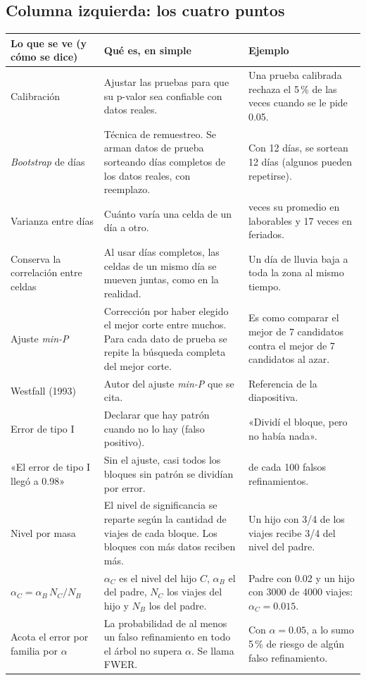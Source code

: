 \documentclass[11pt,a4paper]{article}
\makeatletter
\newenvironment{partes}{%
  \begin{longtable}{@{}>{\raggedright\arraybackslash}p{4.3cm}>{\raggedright\arraybackslash}p{6.0cm}>{\raggedright\arraybackslash}p{5.0cm}@{}}
  \toprule \textbf{Lo que se ve (y cómo se dice)} & \textbf{Qué es, en simple} & \textbf{Ejemplo}\\ \midrule \endhead}{%
  \bottomrule\end{longtable}}
\newcommand{\se}[1]{\newline{\small\color{ucspblue}(se dice «#1»)}}
\makeatother
\begin{document}
\subsection*{Columna izquierda: los cuatro puntos}

\begin{partes}
Calibración & Ajustar las pruebas para que su p-valor sea confiable con datos reales. & Una prueba calibrada rechaza el 5\,\% de las veces cuando se le pide 0.05. \\
\emph{Bootstrap} de días \se{bútstrap de días} & Técnica de remuestreo. Se arman datos de prueba sorteando días completos de los datos reales, con reemplazo. & Con 12 días, se sortean 12 días (algunos pueden repetirse). \\
Varianza entre días & Cuánto varía una celda de un día a otro. & 3 veces su promedio en laborables y 17 veces en feriados. \\
Conserva la correlación entre celdas & Al usar días completos, las celdas de un mismo día se mueven juntas, como en la realidad. & Un día de lluvia baja a toda la zona al mismo tiempo. \\
Ajuste \emph{min-P} \se{mín pe} & Corrección por haber elegido el mejor corte entre muchos. Para cada dato de prueba se repite la búsqueda completa del mejor corte. & Es como comparar el mejor de 7 candidatos contra el mejor de 7 candidatos al azar. \\
Westfall (1993) & Autor del ajuste \emph{min-P} que se cita. & Referencia de la diapositiva. \\
Error de tipo I \se{error de tipo uno} & Declarar que hay patrón cuando no lo hay (falso positivo). & «Dividí el bloque, pero no había nada». \\
«El error de tipo I llegó a 0.98» & Sin el ajuste, casi todos los bloques sin patrón se dividían por error. & 98 de cada 100 falsos refinamientos. \\
Nivel por masa \se{nivel por masa} & El nivel de significancia se reparte según la cantidad de viajes de cada bloque. Los bloques con más datos reciben más. & Un hijo con 3/4 de los viajes recibe 3/4 del nivel del padre. \\
$\alpha_C=\alpha_B\,N_C/N_B$ \se{alfa sub C es igual a alfa sub B por N sub C sobre N sub B} & $\alpha_C$ es el nivel del hijo $C$, $\alpha_B$ el del padre, $N_C$ los viajes del hijo y $N_B$ los del padre. & Padre con 0.02 y un hijo con 3000 de 4000 viajes: $\alpha_C=0.015$. \\
Acota el error por familia por $\alpha$ \se{efe-doble u-e-erre} & La probabilidad de al menos un falso refinamiento en todo el árbol no supera $\alpha$. Se llama FWER. & Con $\alpha=0.05$, a lo sumo 5\,\% de riesgo de algún falso refinamiento. \\

\end{partes}
\end{document}
